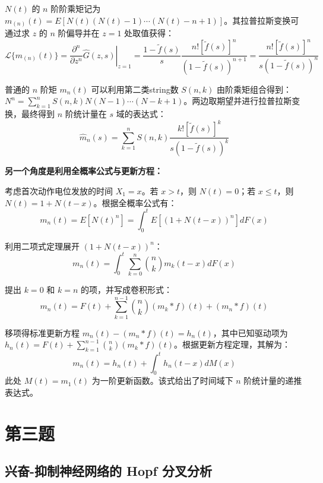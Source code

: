 \documentclass[UTF8]{ctexart}
\begin{document}
$N(t)$ 的 $n$ 阶阶乘矩记为 $m_{(n)}(t) = E[N(t)(N(t)-1)\cdots(N(t)-n+1)]$。其拉普拉斯变换可通过求 $z$ 的 $n$ 阶偏导并在 $z=1$ 处取值获得：
\begin{equation}
	\mathcal{L}\{m_{(n)}(t)\} = \left. \frac{\partial^n}{\partial z^n} \hat{G}(z, s) \right|_{z=1} = \frac{1 - \tilde{f}(s)}{s} \frac{n! [\tilde{f}(s)]^n}{(1 - \tilde{f}(s))^{n+1}} = \frac{n! [\tilde{f}(s)]^n}{s(1 - \tilde{f}(s))^n}
\end{equation}

普通的 $n$ 阶矩 $m_n(t)$ 可以利用第二类string数 $S(n, k)$ 由阶乘矩组合得到：$N^n = \sum_{k=1}^{n} S(n, k) N(N-1)\cdots(N-k+1)$。两边取期望并进行拉普拉斯变换，最终得到 $n$ 阶统计量在 $s$ 域的表达式：
\begin{equation}
	\hat{m}_n(s) = \sum_{k=1}^{n} S(n, k) \frac{k! [\tilde{f}(s)]^k}{s(1 - \tilde{f}(s))^k}
\end{equation}

\textbf{另一个角度是利用全概率公式与更新方程：}

考虑首次动作电位发放的时间 $X_1 = x$。若 $x > t$，则 $N(t) = 0$；若 $x \le t$，则 $N(t) = 1 + N(t-x)$。根据全概率公式有：
\begin{equation}
	m_n(t) = E[N(t)^n] = \int_0^t E[(1 + N(t-x))^n] dF(x)
\end{equation}

利用二项式定理展开 $(1 + N(t-x))^n$：
\begin{equation}
	m_n(t) = \int_0^t \sum_{k=0}^{n} \binom{n}{k} m_k(t-x) dF(x)
\end{equation}

提出 $k=0$ 和 $k=n$ 的项，并写成卷积形式：
\begin{equation}
	m_n(t) = F(t) + \sum_{k=1}^{n-1} \binom{n}{k} (m_k * f)(t) + (m_n * f)(t)
\end{equation}

移项得标准更新方程 $m_n(t) - (m_n * f)(t) = h_n(t)$，其中已知驱动项为 $h_n(t) = F(t) + \sum_{k=1}^{n-1} \binom{n}{k} (m_k * f)(t)$。根据更新方程定理，其解为：
\begin{equation}
	m_n(t) = h_n(t) + \int_0^t h_n(t-x) dM(x)
\end{equation}
此处 $M(t) = m_1(t)$ 为一阶更新函数。该式给出了时间域下 $n$ 阶统计量的递推表达式。


\section{第三题}
\subsection{兴奋-抑制神经网络的 Hopf 分叉分析}
\end{document}
